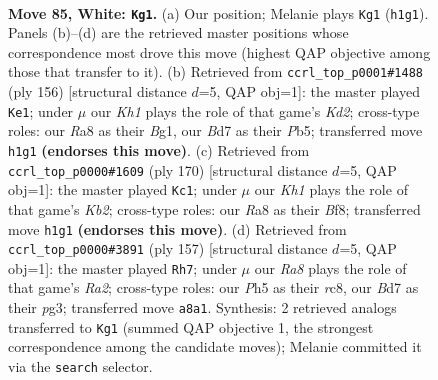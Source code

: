 \documentclass[11pt]{article}
\begin{document}
\clearpage

\begin{figure}[p]\centering
\begin{subfigure}{0.46\textwidth}\centering
\resizebox{\linewidth}{!}{%
\newchessgame
\chessboard[
  setfen={R7/3B1P2/8/7P/8/1k6/8/7K w - - 1 85},
  showmover=false,
  pgfstyle=straightmove, color=movearrow, markmove={h1-g1}
]}
\caption{}
\end{subfigure}\hfill
\begin{subfigure}{0.46\textwidth}\centering
\resizebox{\linewidth}{!}{%
\newchessgame
\chessboard[
  setfen={8/8/5p2/1P1k3b/8/8/3K4/6B1 w - - 1 79},
  showmover=false,
  pgfstyle=straightmove, color=movearrow, markmove={d2-e1}
]}
\caption{}
\end{subfigure}
\\[4pt]
\begin{subfigure}{0.46\textwidth}\centering
\resizebox{\linewidth}{!}{%
\newchessgame
\chessboard[
  setfen={5B2/3k4/6b1/6P1/8/8/1K6/8 w - - 3 86},
  showmover=false,
  pgfstyle=straightmove, color=movearrow, markmove={b2-c1}
]}
\caption{}
\end{subfigure}\hfill
\begin{subfigure}{0.46\textwidth}\centering
\resizebox{\linewidth}{!}{%
\newchessgame
\chessboard[
  setfen={2R5/r7/7k/5p2/8/1K4P1/8/8 b - - 6 79},
  showmover=false,
  pgfstyle=straightmove, color=movearrow, markmove={a7-h7}
]}
\caption{}
\end{subfigure}
\caption{\textbf{Move 85, White: \texttt{Kg1}.} (a) Our position; Melanie plays \texttt{Kg1} (\texttt{h1g1}). Panels (b)--(d) are the retrieved master positions whose correspondence most drove this move (highest QAP objective among those that transfer to it). (b) Retrieved from \texttt{ccrl\_top\_p0001\#1488} (ply 156) [structural distance $d$=5, QAP obj=1]: the master played \texttt{Ke1}; under $\mu$ our \emph{Kh1} plays the role of that game's \emph{Kd2}; cross-type roles: our \emph{R}a8 as their \emph{B}g1, our \emph{B}d7 as their \emph{P}b5; transferred move \texttt{h1g1} \textbf{(endorses this move)}. (c) Retrieved from \texttt{ccrl\_top\_p0000\#1609} (ply 170) [structural distance $d$=5, QAP obj=1]: the master played \texttt{Kc1}; under $\mu$ our \emph{Kh1} plays the role of that game's \emph{Kb2}; cross-type roles: our \emph{R}a8 as their \emph{B}f8; transferred move \texttt{h1g1} \textbf{(endorses this move)}. (d) Retrieved from \texttt{ccrl\_top\_p0000\#3891} (ply 157) [structural distance $d$=5, QAP obj=1]: the master played \texttt{Rh7}; under $\mu$ our \emph{Ra8} plays the role of that game's \emph{Ra2}; cross-type roles: our \emph{P}h5 as their \emph{r}c8, our \emph{B}d7 as their \emph{p}g3; transferred move \texttt{a8a1}. Synthesis: 2 retrieved analogs transferred to \texttt{Kg1} (summed QAP objective 1, the strongest correspondence among the candidate moves); Melanie committed it via the \texttt{search} selector.}
\label{fig:thought-m168}
\end{figure}
\end{document}

